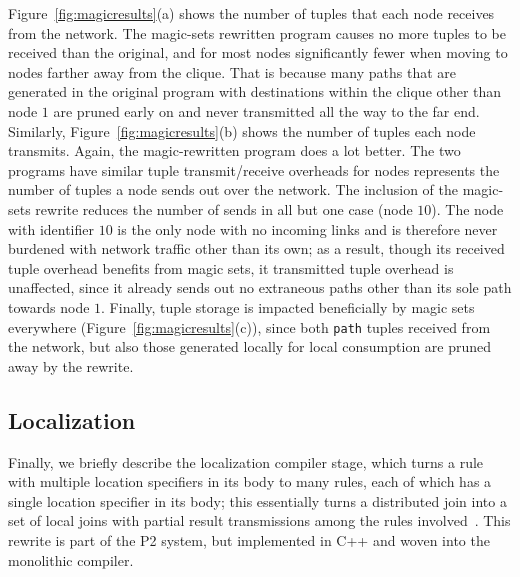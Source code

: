 \documentclass{sigmod08}
\newcommand{\ol}[1]{\texttt{\small #1}\xspace}
\begin{document}
Figure~\ref{fig:magicresults}(a) shows the number of tuples that each node receives from
the network. The magic-sets rewritten program causes no more tuples to
be received than the original, and for most nodes significantly fewer
when moving to nodes farther away from the clique. That is because many
paths that are generated in the original program with destinations
within the clique other than node $1$ are pruned early on and never
transmitted all the way to the far end.    Similarly,
Figure~\ref{fig:magicresults}(b) shows the number of tuples each node transmits.
Again, the magic-rewritten program does a lot better.  The two programs
have similar tuple transmit/receive overheads for nodes represents the number of tuples a node sends out
over the network. The inclusion of the magic-sets rewrite reduces the number of sends
in all but one case (node $10$). The node with identifier $10$ is the only node with 
no incoming links and 
is therefore never burdened with network traffic other than its
own; as a result, though its received tuple overhead benefits from magic
sets, it transmitted tuple overhead is unaffected, since it already
sends out no extraneous paths other than its sole path towards node $1$.
Finally, tuple storage is impacted beneficially by magic sets everywhere
(Figure~\ref{fig:magicresults}(c)), since
both \ol{path} tuples received from the network, but also those
generated locally for local consumption are pruned away by the rewrite.






\subsection{Localization}
\label{sec:localization}

Finally, we briefly describe the localization compiler stage, which turns
a rule with  multiple
location specifiers in its body to many rules, each of which has a
single location specifier in its body; this essentially turns a
distributed join into a set of local joins with partial result
transmissions among the rules involved~\cite{loo-sigmod06}. This rewrite
is part of the P2
system, but implemented in C++ and woven into the monolithic compiler.
\end{document}
